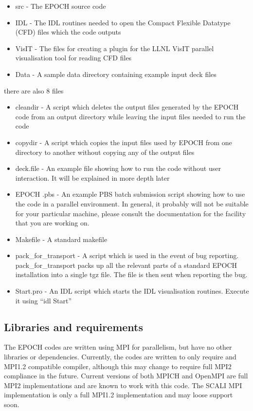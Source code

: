 \documentclass[12pt]{article}
\newcommand{\EPOCH}{{\color{warwickdark}\fontfamily{phv}\selectfont EPOCH} }
\begin{document}
\begin{itemize}
\item src - The \EPOCH source code
\item IDL - The IDL routines needed to open the Compact Flexible Datatype
  (CFD) files which the code outputs
\item VisIT - The files for creating a plugin for the LLNL VisIT parallel
  visualisation tool for reading CFD files
\item Data - A sample data directory containing example input deck files
\end{itemize}
there are also 8 files

\begin{itemize}
\item cleandir - A script which deletes the output files generated by the
  \EPOCH code from an output directory while leaving the input files needed to
  run the code
\item copydir - A script which copies the input files used by \EPOCH from one
  directory to another without copying any of the output files
\item deck.file - An example file showing how to run the code without user
  interaction. It will be explained in more depth later
\item \EPOCH.pbs - An example PBS batch submission script showing how to use
  the code in a parallel environment. In general, it probably will not be
  suitable for your particular machine, please consult the documentation for
  the facility that you are working on.
\item Makefile - A standard makefile
\item pack\_for\_transport - A script which is used in the event of bug
  reporting. pack\_for\_transport packs up all the relevant parts of a
  standard \EPOCH installation into a single tgz file. The file is then sent
  when reporting the bug.
\item Start.pro - An IDL script which starts the IDL visualisation
  routines. Execute it using ``idl Start''
\end{itemize}

\subsection{Libraries and requirements}
The \EPOCH codes are written using MPI for parallelism, but have no other
libraries or dependencies. Currently, the codes are written to only require and
MPI1.2 compatible compiler, although this may change to require full MPI2
compliance in the future. Current versions of both MPICH and OpenMPI are full
MPI2 implementations and are known to work with this code. The SCALI MPI
implementation is only a full MPI1.2 implementation and may loose support
soon.\\
\end{document}
